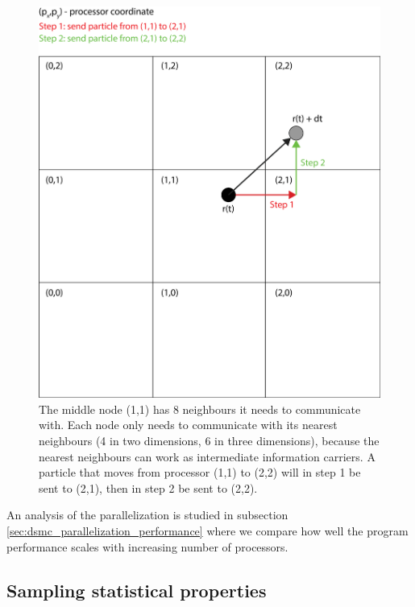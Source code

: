 \begin{figure}[h]
\begin{center}
\includegraphics[width=\textwidth, trim=0cm 0cm 0cm 0cm, clip]{DSMC/figures/parallelization_facet_technique.eps}
\end{center}
\caption{The middle node (1,1) has 8 neighbours it needs to communicate with. Each node only needs to communicate with its nearest neighbours (4 in two dimensions, 6 in three dimensions), because the nearest neighbours can work as intermediate information carriers. A particle that moves from processor (1,1) to (2,2) will in step 1 be sent to (2,1), then in step 2 be sent to (2,2).}
\label{fig:parallelization_facet_technique}
\end{figure}
An analysis of the parallelization is studied in subsection \ref{sec:dsmc_parallelization_performance} where we compare how well the program performance scales with increasing number of processors. 
\subsection{Sampling statistical properties}